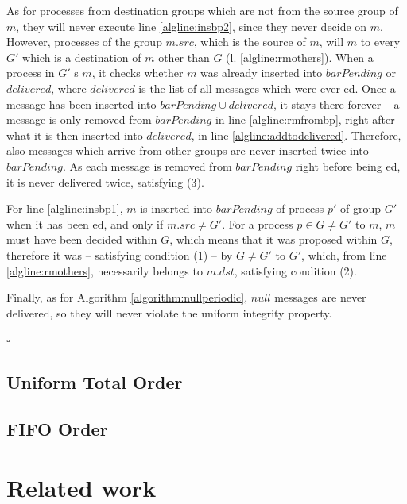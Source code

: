 \documentclass[times, 10pt]{article}
\begin{document}
As for processes from destination groups which are not from the source group of $m$, they will never execute line \ref{algline:insbp2}, since they never decide on $m$. However, processes of the group $m.src$, which is the source of $m$, will \rmcast{} $m$ to every $G'$ which is a destination of $m$ other than $G$ (l. \ref{algline:rmothers}). When a process in $G'$ \rmdel{}s $m$, it checks whether $m$ was already inserted into $barPending$ or $delivered$, where $delivered$ is the list of all messages which were ever \amdel{}ed. Once a message has been inserted into \mbox{$barPending \cup delivered$}, it stays there forever -- a message is only removed from $barPending$ in line \ref{algline:rmfrombp}, right after what it is then inserted into $delivered$, in line \ref{algline:addtodelivered}. Therefore, also messages which arrive from other groups are never inserted twice into $barPending$. As each message is removed from $barPending$ right before being \amdel{}ed, it is never delivered twice, satisfying (3).

For line \ref{algline:insbp1}, $m$ is inserted into $barPending$ of process $p'$ of group $G'$ when it has been \rmdel{}ed, and only if $m.src \neq G'$. For a process $p \in G \neq G'$ to \rmcast{} $m$, $m$ must have been decided within $G$, which means that it was proposed within $G$, therefore it was \amcast{} -- satisfying condition (1) -- by $G \neq G'$ to $G'$, which, from line \ref{algline:rmothers}, necessarily belongs to $m.dst$, satisfying condition (2).

Finally, as for Algorithm \ref{algorithm:nullperiodic}, $null$ messages are never delivered, so they will never violate the uniform integrity property.

\begin{flushright}
$\square$
\end{flushright}

\subsection{Uniform Total Order}

\subsection{FIFO Order}

\section{Related work}
\end{document}
